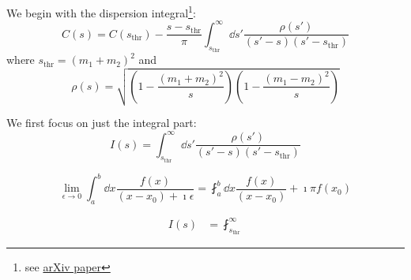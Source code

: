 We begin with the dispersion integral\footnote{see \href{https://arxiv.org/pdf/1411.2004.pdf}{arXiv paper}}:
\begin{equation}
  C(s) = C(s_\text{thr}) - \frac{s - s_\text{thr}}{\pi} \int_{s_\text{thr}}^{\infty} \dd{s'} \frac{\rho(s')}{(s' - s)(s' - s_\text{thr})}
\end{equation}
where $s_\text{thr} = (m_1 + m_2)^2$ and
\begin{equation}
  \rho(s) = \sqrt{\left(1 - \frac{(m_1 + m_2)^2}{s}\right)\left(1 - \frac{(m_1 - m_2)^2}{s}\right)}
\end{equation}

We first focus on just the integral part:
\begin{equation}
  I(s) = \int_{s_\text{thr}}^{\infty} \dd{s'} \frac{\rho(s')}{(s' - s)(s'-s_\text{thr})}
\end{equation}

\begin{equation}
  \lim_{\epsilon\to 0}\int_a^b \dd{x} \frac{f(x)}{(x-x_0) + \imath\epsilon} = \fint_a^b \dd{x} \frac{f(x)}{(x-x_0)} + \imath\pi f(x_0)
\end{equation}

\begin{align}
  I(s) &= \fint_{s_\text{thr}}^{\infty} 
\end{align}
